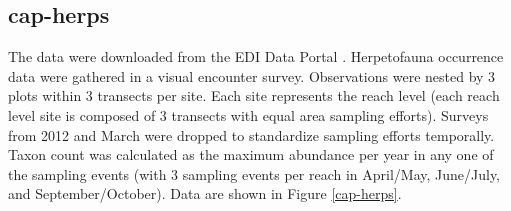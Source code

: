 \documentclass[11pt, oneside]{article}
\begin{document}
\subsection {cap-herps}
The data were downloaded from the EDI Data Portal \citep{cap-herps}.
Herpetofauna occurrence data were gathered in a visual encounter survey.
Observations were nested by 3 plots within 3 transects per site. 
Each site represents the reach level (each reach level site is composed of 3 transects with equal area sampling efforts). 
Surveys from 2012 and March were dropped to standardize sampling efforts temporally. 
Taxon count was calculated as the maximum abundance per year in any one of the sampling events (with 3 sampling events per reach in April/May, June/July, and September/October). 
Data are shown in Figure \ref{cap-herps}.
\end{document}
